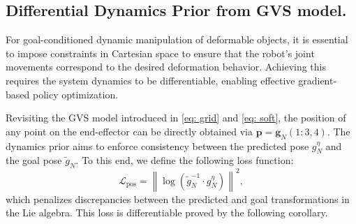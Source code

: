 \documentclass{article}
\begin{document}
 
\subsection{Differential Dynamics Prior from GVS model.} 
For goal-conditioned dynamic manipulation of deformable objects, it is essential to impose constraints in Cartesian space to ensure that the robot's joint movements correspond to the desired deformation behavior. Achieving this requires the system dynamics to be differentiable, enabling effective gradient-based policy optimization.

Revisiting the GVS model introduced in \cref{eq: grid} and \cref{eq: soft}, the position of any point on the end-effector can be directly obtained via $\bm{p} = \mathbf{g}_N(1\!:\!3,4)$. The dynamics prior aims to enforce consistency between the predicted pose $g^\eta_N$ and the goal pose $\tilde{g}_N$. To this end, we define the following loss function:
\begin{equation}
\mathcal{L}_{\text{pos}}= \left\| \log\left( \tilde{g}_N^{-1} \cdot g^\eta_N \right) \right\|^2,
\end{equation}
which penalizes discrepancies between the predicted and goal transformations in the Lie algebra. This loss is differentiable proved by the following corollary.
\end{document}
